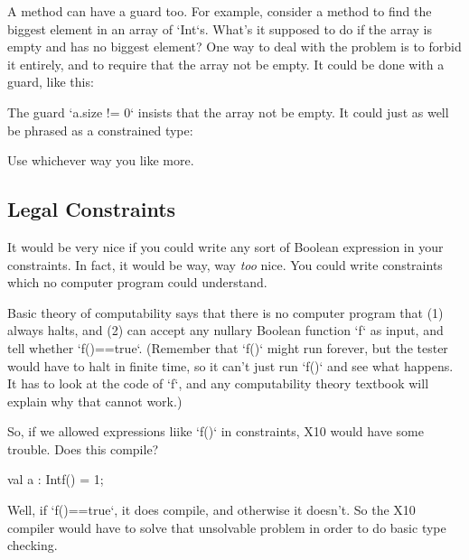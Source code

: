 A method can have a guard too. For example, consider a method to find the
biggest element in an array of \xcd`Int`s.  What's it supposed to do if the
array is empty and has no biggest element?  One way to deal with the problem
is to forbid it entirely, and to require that the array not be empty.  It
could be done with a guard, like this: 
\begin{xtennum}[]
def max(a:Array[Int]){a.size != 0} { 
\end{xtennum}
The guard \xcd`{a.size != 0}` insists that the array not be empty.
It could just as well be phrased as a constrained type: 
\begin{xtennum}[]
def min(a:Array[Int]{a.size!=0}) { 
\end{xtennum}
Use whichever way you like more.


\subsection{Legal Constraints}
\label{sect:LegalConstraints}

It would be very nice if you could write any sort of Boolean expression in
your constraints.  In fact, it would be way, way {\em too} nice.  You could
write constraints which no computer program could understand. 

\begin{finepoint}
Basic theory of computability says that there is no computer program that (1)
always halts, and (2) can accept any nullary Boolean function \xcd`f` as
input, and tell whether \xcd`f()==true`.  (Remember that \xcd`f()` might run
forever, but the tester would have to halt in finite time, so it can't just
run \xcd`f()` and see what happens.  It has to look at the code of \xcd`f`,
and any computability theory textbook will explain why that cannot work.)

So, if we allowed expressions liike \xcd`f()` in constraints, X10 would have
some trouble.  Does this compile?
\begin{xten}
val a : Int{f()} = 1;
\end{xten}
Well, if \xcd`f()==true`, it does compile, and otherwise it doesn't.  So the
X10 compiler would have to solve that unsolvable problem in order to do basic
type checking. 
\end{finepoint}

